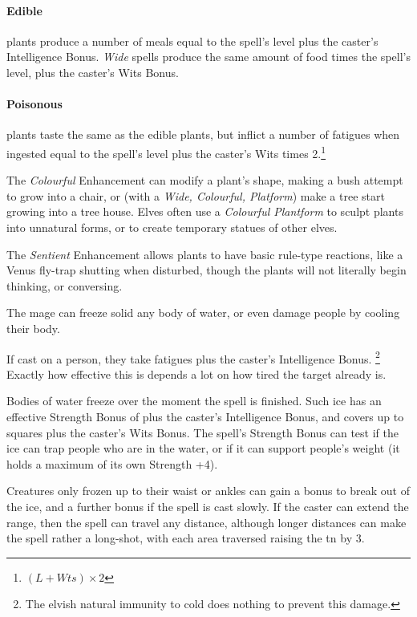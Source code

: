 \begin{multicols}{2}
\paragraph{Edible} plants produce a number of meals equal to the spell's level plus the caster's Intelligence Bonus.
\textit{Wide} spells produce the same amount of food times the spell's level, plus the caster's Wits Bonus.

\paragraph{Poisonous} plants taste the same as the edible plants, but inflict a number of \glspl{fatigue} when ingested equal to the spell's level plus the caster's Wits times 2.\footnote{$(L + Wts)\times 2$}

The \textit{Colourful} Enhancement can modify a plant's shape, making a bush attempt to grow into a chair, or (with a \textit{Wide, Colourful, Platform}) make a tree start growing into a tree house. Elves often use a \textit{Colourful Plantform} to sculpt plants into unnatural forms, or to create temporary statues of other elves.

The \textit{Sentient} Enhancement allows plants to have basic rule-type reactions, like a Venus fly-trap shutting when disturbed, though the plants will not literally begin thinking, or conversing.

\label{spellFreeze}

The mage can freeze solid any body of water, or even damage people by cooling their body.

If cast on a person, they take  \glspl{fatigue} plus the caster's Intelligence Bonus.%
\footnote{The elvish natural immunity to cold does nothing to prevent this damage.}
Exactly how effective this is depends a lot on how tired the target already is.

Bodies of water freeze over the moment the spell is finished.
Such ice has an effective Strength Bonus of  plus the caster's Intelligence Bonus, and covers up to  squares plus the caster's Wits Bonus.
The spell's Strength Bonus can test if the ice can trap people who are in the water, or if it can support people's weight (it holds a maximum  of its own Strength +4).

Creatures only frozen up to their waist or ankles can gain a bonus to break out of the ice, and a further bonus if the spell is cast slowly.
If the caster can extend the range, then the spell can travel any distance, although longer distances can make the spell rather a long-shot, with each area traversed raising the \gls{tn} by 3.


\end{multicols}
